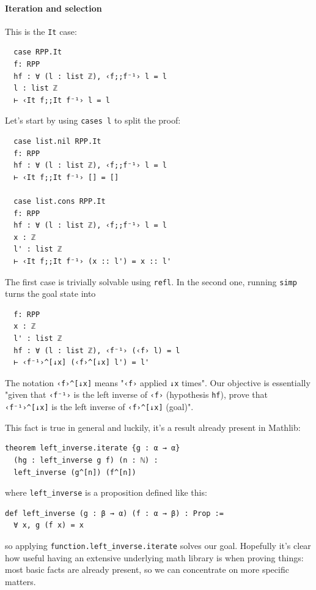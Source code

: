 \documentclass{book}
\theoremstyle{definition}
\theoremstyle{remark}
\theoremstyle{plain}
\begin{document}
\paragraph{Iteration and selection}
This is the \lstinline{It} case:
\begin{lstlisting}
  case RPP.It
  f: RPP
  hf : ∀ (l : list ℤ), ‹f;;f⁻¹› l = l
  l : list ℤ
  ⊢ ‹It f;;It f⁻¹› l = l
\end{lstlisting}
Let's start by using \lstinline{cases l} to split the proof:
\begin{lstlisting}
  case list.nil RPP.It
  f: RPP
  hf : ∀ (l : list ℤ), ‹f;;f⁻¹› l = l
  ⊢ ‹It f;;It f⁻¹› [] = []

  case list.cons RPP.It
  f: RPP
  hf : ∀ (l : list ℤ), ‹f;;f⁻¹› l = l
  x : ℤ
  l' : list ℤ
  ⊢ ‹It f;;It f⁻¹› (x :: l') = x :: l'
\end{lstlisting}
The first case is trivially solvable using \lstinline{refl}.
In the second one, running \lstinline{simp} turns the goal state into
\begin{lstlisting}
  f: RPP
  x : ℤ
  l' : list ℤ
  hf : ∀ (l : list ℤ), ‹f⁻¹› (‹f› l) = l
  ⊢ ‹f⁻¹›^[↓x] (‹f›^[↓x] l') = l'
\end{lstlisting}
The notation \lstinline{‹f›^[↓x]} means "\lstinline{‹f›} applied \lstinline{↓x} times".
Our objective is essentially "given that \lstinline{‹f⁻¹›} is the left inverse of \lstinline{‹f›} (hypothesis \lstinline{hf}),
prove that \lstinline{‹f⁻¹›^[↓x]} is the left inverse of \lstinline{‹f›^[↓x]} (goal)".

This fact is true in general and luckily, it's a result already present in Mathlib:
\begin{lstlisting}
theorem left_inverse.iterate {g : α → α}
  (hg : left_inverse g f) (n : ℕ) :
  left_inverse (g^[n]) (f^[n])
\end{lstlisting}
where \lstinline{left_inverse} is a proposition defined like this:
\begin{lstlisting}
def left_inverse (g : β → α) (f : α → β) : Prop :=
  ∀ x, g (f x) = x
\end{lstlisting}
so applying \lstinline{function.left_inverse.iterate} solves our goal.
Hopefully it's clear how useful having an extensive underlying math library is when proving things:
most basic facts are already present, so we can concentrate on more specific matters.

\paragraph{}
\end{document}
